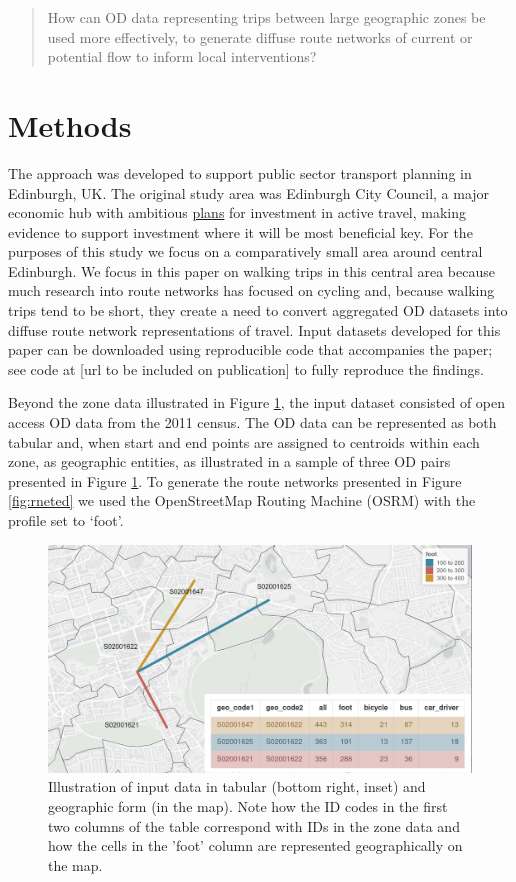 \documentclass[
]{article}
\begin{document}
\begin{quote}
How can OD data representing trips between large geographic zones be used more effectively, to generate diffuse route networks of current or potential flow to inform local interventions?
\end{quote}

\hypertarget{methods}{%
\section{Methods}\label{methods}}

The approach was developed to support public sector transport planning in Edinburgh, UK.
The original study area was Edinburgh City Council, a major economic hub with ambitious \href{https://www.edinburgh.gov.uk/downloads/file/30073/active-travel-investment-programme-update-october-2021}{plans} for investment in active travel, making evidence to support investment where it will be most beneficial key.
For the purposes of this study we focus on a comparatively small area around central Edinburgh.
We focus in this paper on walking trips in this central area because much research into route networks has focused on cycling and, because walking trips tend to be short, they create a need to convert aggregated OD datasets into diffuse route network representations of travel.
Input datasets developed for this paper can be downloaded using reproducible code that accompanies the paper; see code at {[}url to be included on publication{]} to fully reproduce the findings.

Beyond the zone data illustrated in Figure \ref{fig:od}, the input dataset consisted of open access OD data from the 2011 census.
The OD data can be represented as both tabular and, when start and end points are assigned to centroids within each zone, as geographic entities, as illustrated in a sample of three OD pairs presented in Figure \ref{fig:od}.
To generate the route networks presented in Figure \ref{fig:rneted} we used the OpenStreetMap Routing Machine (OSRM) with the profile set to `foot'.

\begin{figure}

{\centering \includegraphics[width=0.8\linewidth]{figures/od-top-3-zones-metafigure} 

}

\caption{Illustration of input data in tabular (bottom right, inset) and geographic form (in the map). Note how the ID codes in the first two columns of the table correspond with IDs in the zone data and how the cells in the 'foot' column are represented geographically on the map.}\label{fig:od}
\end{figure}
\end{document}
